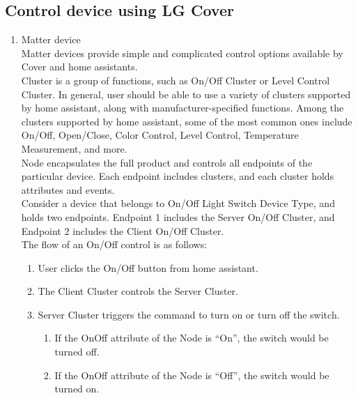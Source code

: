 \documentclass[conference]{IEEEtran}
\begin{document}
\subsection{\large{Control device using LG Cover}}
\begin{enumerate}[label=\arabic*.]

\item {\large{Matter device}}\\
Matter devices provide simple and complicated control options available by Cover and home assistants.\\
Cluster is a group of functions, such as On/Off Cluster or Level Control Cluster. In general, user should be able to use a variety of clusters supported by home assistant, along with manufacturer-specified functions. Among the clusters supported by home assistant, some of the most common ones include On/Off, Open/Close, Color Control, Level Control, Temperature Measurement, and more.\\
Node encapsulates the full product and controls all endpoints of the particular device. Each endpoint includes clusters, and each cluster holds attributes and events.\\
Consider a device that belongs to On/Off Light Switch Device Type, and holds two endpoints. Endpoint 1 includes the Server On/Off Cluster, and Endpoint 2 includes the Client On/Off Cluster.\\
The flow of an On/Off control is as follows:\\
\begin{enumerate}[label=\alph*.]
\item User clicks the On/Off button from home assistant.\\
\item The Client Cluster controls the Server Cluster.\\
\item Server Cluster triggers the command to turn on or turn off the switch.\\
\begin{enumerate}[label=\roman*.]
\item If the OnOff attribute of the Node is “On”, the switch would be turned off.\\
\item If the OnOff attribute of the Node is “Off”, the switch would be turned on.\\
\end{enumerate}
\end{enumerate}


\end{enumerate}
\end{document}
